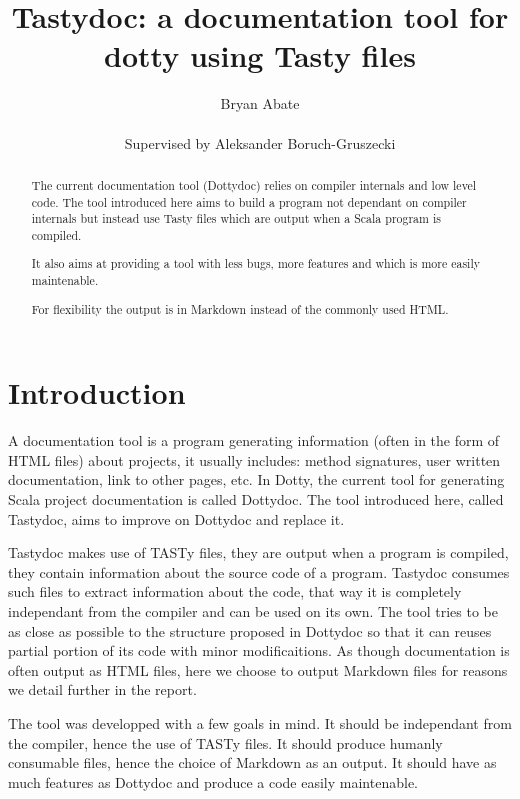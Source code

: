 \documentclass{report}
\begin{document}
\title{Tastydoc: a documentation tool for dotty using Tasty files}
\author{Bryan Abate
\\\\\small{Supervised by Aleksander Boruch-Gruszecki}}

\maketitle

\begin{abstract}
The current documentation tool (Dottydoc) relies on compiler internals and low level code. The tool introduced here aims to build a program not dependant on compiler internals but instead use Tasty files which are output when a Scala program is compiled.

It also aims at providing a tool with less bugs, more features and which is more easily maintenable.

For flexibility the output is in Markdown instead of the commonly used HTML.
\end{abstract}

\tableofcontents

\chapter{Introduction}

A documentation tool is a program generating information (often in the form of HTML files) about projects, it usually includes: method signatures, user written documentation, link to other pages, etc.
In Dotty, the current tool for generating Scala project documentation is called Dottydoc. The tool introduced here, called Tastydoc, aims to improve on Dottydoc and replace it.

Tastydoc makes use of TASTy files, they are output when a program is compiled, they contain information about the source code of a program. Tastydoc consumes such files to extract information about the code, that way it is completely independant from the compiler and can be used on its own.
The tool tries to be as close as possible to the structure proposed in Dottydoc so that it can reuses partial portion of its code with minor modificaitions.
As though documentation is often output as HTML files, here we choose to output Markdown files for reasons we detail further in the report.

The tool was developped with a few goals in mind. It should be independant from the compiler, hence the use of TASTy files. It should produce humanly consumable files, hence the choice of Markdown as an output. It should have as much features as Dottydoc and produce a code easily maintenable.
\end{document}
